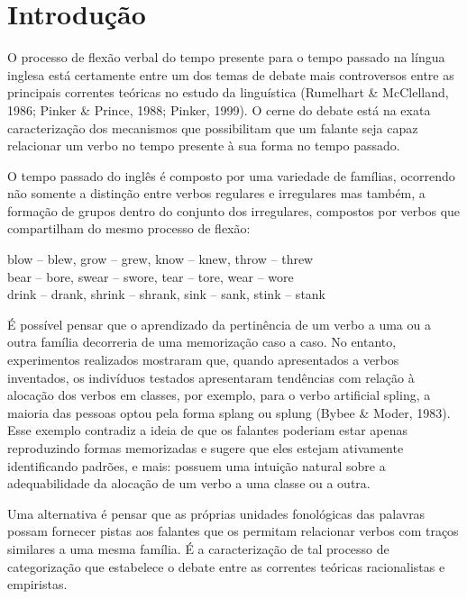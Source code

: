 \chapter{Introdução}
\label{ch:01-introduction}

O processo de flexão verbal do tempo presente para o tempo passado na língua inglesa está certamente entre um dos temas de debate mais controversos entre as principais correntes teóricas no estudo da linguística (Rumelhart \& McClelland, 1986; Pinker \& Prince, 1988; Pinker, 1999). O cerne do debate está na exata caracterização dos mecanismos que possibilitam que um falante seja capaz relacionar um verbo no tempo presente à sua forma no tempo passado. 

O tempo passado do inglês é composto por uma variedade de famílias, ocorrendo não somente a distinção entre verbos regulares e irregulares mas também, a formação de grupos dentro do conjunto dos irregulares, compostos por verbos que compartilham do mesmo processo de flexão:

\begin{center}
blow – blew, grow – grew, know – knew, throw – threw\\
bear – bore, swear – swore, tear – tore, wear – wore\\
drink – drank, shrink – shrank, sink – sank, stink – stank \\
\end{center}

É possível pensar que o aprendizado da pertinência de um verbo a uma ou a outra família decorreria de uma memorização caso a caso. No entanto, experimentos realizados mostraram que, quando apresentados a verbos inventados, os indivíduos testados apresentaram tendências com relação à alocação dos verbos em classes, por exemplo, para o verbo artificial spling, a maioria das pessoas optou pela forma splang  ou splung (Bybee \& Moder, 1983). Esse exemplo contradiz a ideia de que os falantes poderiam estar apenas reproduzindo formas memorizadas e sugere que eles estejam ativamente identificando padrões, e mais: possuem uma intuição natural sobre a adequabilidade da alocação de um verbo a uma classe ou a outra.

Uma alternativa é pensar que as próprias unidades fonológicas das palavras possam fornecer pistas aos falantes que os permitam relacionar verbos com traços similares a uma mesma família. É a caracterização de tal processo de categorização que estabelece o debate entre as correntes teóricas racionalistas e empiristas.  

